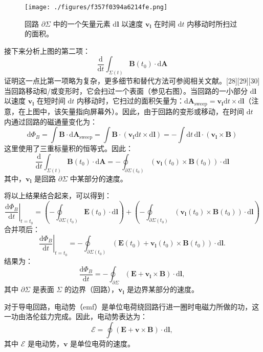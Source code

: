 \begin{figure}[ht]
\centering
\texttt{[image: ./figures/f357f0394a6214fe.png]}
\caption{回路 \(\partial \Sigma\) 中的一个矢量元素 \(\mathrm{d}\mathbf{l}\) 以速度 \(\mathbf{v}_\mathbf{l}\) 在时间 \(\mathrm{d}t\) 内移动时所扫过的面积。} \label{fig_FLDL_9}
\end{figure}
接下来分析上图的第二项：
\[
\frac{\mathrm{d}}{\mathrm{d} t} \int_{\Sigma(t)} \mathbf{B}(t_0) \cdot \mathrm{d} \mathbf{A}~
\]
证明这一点比第一项略为复杂，更多细节和替代方法可参阅相关文献。[28][29][30]  
当回路移动和/或变形时，它会扫过一个表面（参见右图）。当回路的一小部分 \( \mathrm{d}\mathbf{l} \) 以速度 \( \mathbf{v}_\mathbf{l} \) 在短时间 \( \mathrm{d}t \) 内移动时，它扫过的面积矢量为：\(\mathrm{d}\mathbf{A}_{\text{sweep}} = \mathbf{v}_\mathbf{l} \mathrm{d}t \times \mathrm{d}\mathbf{l}\)（注意，在上图中，该矢量指向屏幕外）。因此，由于回路的变形或移动，在时间 \( \mathrm{d}t \) 内通过回路的磁通量变化为：
\[
\mathrm{d}\Phi_B = \int \mathbf{B} \cdot \mathrm{d}\mathbf{A}_{\text{sweep}} = \int \mathbf{B} \cdot (\mathbf{v}_\mathbf{l} \mathrm{d}t \times \mathrm{d}\mathbf{l}) = -\int \mathrm{d}t \, \mathrm{d}\mathbf{l} \cdot (\mathbf{v}_\mathbf{l} \times \mathbf{B})~
\]
这里使用了三重标量积的恒等式。因此：
\[
\frac{\mathrm{d}}{\mathrm{d}t} \int_{\Sigma(t)} \mathbf{B}(t_0) \cdot \mathrm{d}\mathbf{A} = -\oint_{\partial \Sigma(t_0)} (\mathbf{v}_\mathbf{l}(t_0) \times \mathbf{B}(t_0)) \cdot \mathrm{d}\mathbf{l}~
\]
其中，\( \mathbf{v}_\mathbf{l} \) 是回路 \(\partial \Sigma\) 中某部分的速度。

将以上结果结合起来，可以得到：
\[
\left. \frac{\mathrm{d}\Phi_B}{\mathrm{d}t} \right|_{t=t_0} = \left( -\oint_{\partial \Sigma(t_0)} \mathbf{E}(t_0) \cdot \mathrm{d}\mathbf{l} \right) + \left( -\oint_{\partial \Sigma(t_0)} (\mathbf{v}_\mathbf{l}(t_0) \times \mathbf{B}(t_0)) \cdot \mathrm{d}\mathbf{l} \right)~
\]
合并项后：
\[
\left. \frac{\mathrm{d}\Phi_B}{\mathrm{d}t} \right|_{t=t_0} = -\oint_{\partial \Sigma(t_0)} \left( \mathbf{E}(t_0) + \mathbf{v}_\mathbf{l}(t_0) \times \mathbf{B}(t_0) \right) \cdot \mathrm{d}\mathbf{l}.~
\]
结果为：
\[
\frac{\mathrm{d} \Phi_B}{\mathrm{d} t} = -\oint_{\partial \Sigma} \left( \mathbf{E} + \mathbf{v}_\mathbf{l} \times \mathbf{B} \right) \cdot \mathrm{d} \mathbf{l},~
\]
其中 \( \partial \Sigma \) 是表面 \( \Sigma \) 的边界（回路），\( \mathbf{v}_\mathbf{l} \) 是边界某部分的速度。

对于导电回路，电动势（emf）是单位电荷绕回路行进一圈时电磁力所做的功，这一功由洛伦兹力完成。因此，电动势表达为：
\[
\mathcal{E} = \oint \left( \mathbf{E} + \mathbf{v} \times \mathbf{B} \right) \cdot \mathrm{d} \mathbf{l},~
\]
其中 \( \mathcal{E} \) 是电动势，\( \mathbf{v} \) 是单位电荷的速度。


